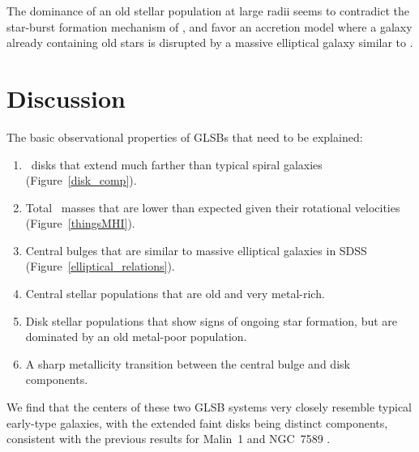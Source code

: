 \documentclass[12pt,preprint]{aastex}
\newcommand\HI{\ion{H}{1}}
\begin{document}
The dominance of an old stellar population at large radii seems to contradict the star-burst formation mechanism of \citet{Mapelli08}, and favor an accretion model where a galaxy already containing old stars is disrupted by a massive elliptical galaxy similar to \citet{Pen06}.





\section{Discussion}\label{sec:discussion}

The basic observational properties of GLSBs that need to be explained:
\begin{enumerate}
\item{\HI\ disks that extend much farther than typical spiral galaxies (Figure~\ref{disk_comp}). }
\item{Total \HI\ masses that are lower than expected given their rotational velocities (Figure~\ref{thingsMHI}).}
\item{Central bulges that are similar to massive elliptical galaxies in SDSS (Figure~\ref{elliptical_relations}).}
\item{Central stellar populations that are old and very metal-rich.}
\item{Disk stellar populations that show signs of ongoing star formation, but are dominated by an old metal-poor population.}
\item{A sharp metallicity transition between the central bulge and disk components.}
\end{enumerate}

\begin{figure*}
\caption{Comparison of GLSB \HI\ masses \citep{Pickering97} with \HI\ masses measured in the THINGS survey \citep{Walter2008}.
While the \HI\ masses in the GLSB systems are high, they are consistent with what would be available in a merger with a V$_{\rm{max}}\sim$110 km/s or smaller galaxy, assuming the merger did not trigger large amounts of star formation and feedback. \label{thingsMHI}}
\end{figure*}


We find that the centers of these two GLSB systems very closely resemble typical early-type galaxies, with the extended faint disks being distinct components, consistent with the previous results for Malin~1 \citep{Barth07} and NGC~7589 \citep{Lelli10}. 
\end{document}
